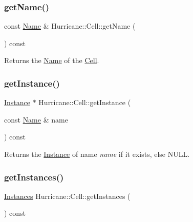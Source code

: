 \subsubsection{\texorpdfstring{get\+Name()}{getName()}}
{\footnotesize\ttfamily const \mbox{\hyperlink{classHurricane_1_1Name}{Name}} \& Hurricane\+::\+Cell\+::get\+Name (\begin{DoxyParamCaption}{ }\end{DoxyParamCaption}) const\hspace{0.3cm}{\ttfamily [inline]}}

Returns the \mbox{\hyperlink{classHurricane_1_1Name}{Name}} of the \mbox{\hyperlink{classHurricane_1_1Cell}{Cell}}. \mbox{\label{classHurricane_1_1Cell_abaf178b24734de37cf0ac31918c096ac}} 
\subsubsection{\texorpdfstring{get\+Instance()}{getInstance()}}
{\footnotesize\ttfamily \mbox{\hyperlink{classHurricane_1_1Instance}{Instance}} $\ast$ Hurricane\+::\+Cell\+::get\+Instance (\begin{DoxyParamCaption}\item[{const \mbox{\hyperlink{classHurricane_1_1Name}{Name}} \&}]{name }\end{DoxyParamCaption}) const\hspace{0.3cm}{\ttfamily [inline]}}

Returns the \mbox{\hyperlink{classHurricane_1_1Instance}{Instance}} of name {\itshape name} if it exists, else {\ttfamily N\+U\+LL}. \mbox{\label{classHurricane_1_1Cell_aa85b3992431b672827167c5d9cb622f2}} 
\subsubsection{\texorpdfstring{get\+Instances()}{getInstances()}}
{\footnotesize\ttfamily \mbox{\hyperlink{namespaceHurricane_ac9436b03a2926f34ad6863deae2baadc}{Instances}} Hurricane\+::\+Cell\+::get\+Instances (\begin{DoxyParamCaption}{ }\end{DoxyParamCaption}) const\hspace{0.3cm}{\ttfamily [inline]}}

